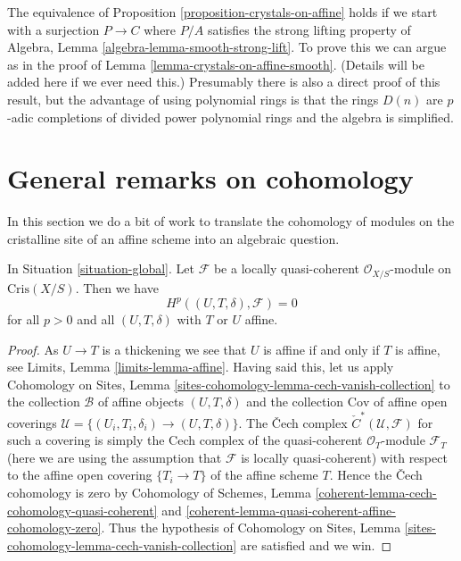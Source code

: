 \begin{remark}
\label{remark-equivalence-more-general}
The equivalence of Proposition \ref{proposition-crystals-on-affine}
holds if we start with a surjection $P \to C$ where $P/A$ satisfies the
strong lifting property of
Algebra, Lemma \ref{algebra-lemma-smooth-strong-lift}.
To prove this we can argue as in the proof of
Lemma \ref{lemma-crystals-on-affine-smooth}.
(Details will be added here if we ever need this.)
Presumably there is also a direct proof of this result, but the advantage
of using polynomial rings is that the rings $D(n)$ are $p$-adic completions
of divided power polynomial rings and the algebra is simplified.
\end{remark}



\section{General remarks on cohomology}
\label{section-cohomology-lqc}

\noindent
In this section we do a bit of work to translate the cohomology
of modules on the cristalline site of an affine scheme into
an algebraic question.

\begin{lemma}
\label{lemma-vanishing-lqc}
In Situation \ref{situation-global}.
Let $\mathcal{F}$ be a locally quasi-coherent $\mathcal{O}_{X/S}$-module
on $\text{Cris}(X/S)$. Then we have
$$
H^p((U, T, \delta), \mathcal{F}) = 0
$$
for all $p > 0$ and all $(U, T, \delta)$ with $T$ or $U$ affine.
\end{lemma}

\begin{proof}
As $U \to T$ is a thickening we see that $U$ is affine if and only if $T$
is affine, see Limits, Lemma \ref{limits-lemma-affine}.
Having said this, let us apply
Cohomology on Sites, Lemma \ref{sites-cohomology-lemma-cech-vanish-collection}
to the collection $\mathcal{B}$ of affine objects $(U, T, \delta)$ and the
collection $\text{Cov}$ of affine open coverings
$\mathcal{U} = \{(U_i, T_i, \delta_i) \to (U, T, \delta)\}$. The
{\v C}ech complex
${\check C}^*(\mathcal{U}, \mathcal{F})$ for such a covering is simply
the Cech complex of the quasi-coherent $\mathcal{O}_T$-module $\mathcal{F}_T$
(here we are using the assumption that $\mathcal{F}$ is locally quasi-coherent)
with respect to the affine open covering $\{T_i \to T\}$ of the
affine scheme $T$. Hence the {\v C}ech cohomology is zero by
Cohomology of Schemes, Lemma
\ref{coherent-lemma-cech-cohomology-quasi-coherent} and
\ref{coherent-lemma-quasi-coherent-affine-cohomology-zero}.
Thus the hypothesis of
Cohomology on Sites, Lemma \ref{sites-cohomology-lemma-cech-vanish-collection}
are satisfied and we win.
\end{proof}

